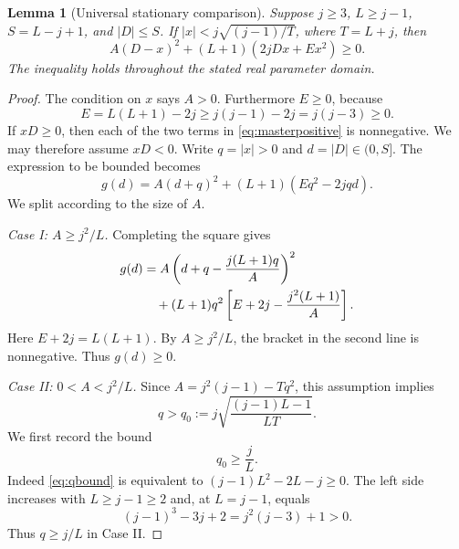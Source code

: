 \documentclass[11pt,a4paper]{article}
\newtheorem{lemma}[theorem]{Lemma}
\begin{document}
\begin{lemma}[Universal stationary comparison]\label{lem:universal}
Suppose $j\ge3$, $L\ge j-1$, $S=L-j+1$, and $|D|\le S$. If $|x|<j\sqrt{(j-1)/T}$, where $T=L+j$, then
\begin{equation}\label{eq:masterpositive}
 \boxed{\quad A(D-x)^2+(L+1)(2jDx+Ex^2)\ge0.\quad}
\end{equation}
The inequality holds throughout the stated real parameter domain.
\end{lemma}
\begin{proof}
The condition on $x$ says $A>0$. Furthermore $E\ge0$, because
\[
 E=L(L+1)-2j\ge j(j-1)-2j=j(j-3)\ge0.
\]
If $xD\ge0$, then each of the two terms in \eqref{eq:masterpositive} is nonnegative. We may therefore assume $xD<0$. Write $q=|x|>0$ and $d=|D|\in(0,S]$. The expression to be bounded becomes
\begin{equation}\label{eq:g}
 g(d)=A(d+q)^2+(L+1)(Eq^2-2jqd).
\end{equation}
We split according to the size of $A$.

\smallskip\noindent\emph{Case I: $A\ge j^2/L$.}
Completing the square gives
\begin{align}\label{eq:square1}
 g(d)&=A\left(d+q-\frac{j(L+1)q}{A}\right)^2\notag\\
 &\quad+(L+1)q^2\left[E+2j-\frac{j^2(L+1)}{A}\right].
\end{align}
Here $E+2j=L(L+1)$. By $A\ge j^2/L$, the bracket in the second line is nonnegative. Thus $g(d)\ge0$.

\smallskip\noindent\emph{Case II: $0<A<j^2/L$.}
Since $A=j^2(j-1)-Tq^2$, this assumption implies
\begin{equation}\label{eq:qmin}
 q>q_0:=j\sqrt{\frac{(j-1)L-1}{LT}}.
\end{equation}
We first record the bound
\begin{equation}\label{eq:qbound}
 q_0\ge\frac jL.
\end{equation}
Indeed \eqref{eq:qbound} is equivalent to $(j-1)L^2-2L-j\ge0$. The left side increases with $L\ge j-1\ge2$ and, at $L=j-1$, equals
\[
 (j-1)^3-3j+2=j^2(j-3)+1>0.
\]
Thus $q\ge j/L$ in Case II.


\end{proof}
\end{document}
